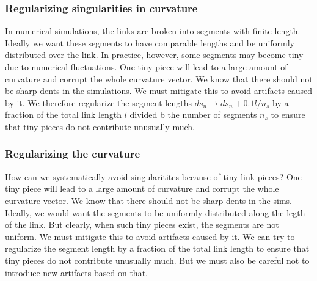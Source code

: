 \documentclass[nofootinbib,preprint,floatfix,titlepage,superscriptaddress]{revtex4} %
\begin{document}
\subsubsection{Regularizing singularities in curvature}
In numerical simulations, the links are broken into segments with finite length. 
Ideally we want these segments to have comparable lengths and be uniformly distributed over the link. 
In practice, however, some segments may become tiny due to numerical fluctuations. 
One tiny piece will lead to a large amount of curvature and corrupt the whole curvature vector. 
We know that there should not be sharp dents in the simulations. %
We must mitigate this to avoid artifacts caused by it. 
We therefore regularize the segment lengths $ds_n\to ds_n+ 0.1 l/n_s$ by a fraction of the total link length $l$ divided b the number of segments $n_s$ to ensure that tiny pieces do not contribute unusually much. 

\subsubsection{Regularizing the curvature}
How can we systematically avoid singularitites because of tiny link pieces? One tiny piece will lead to a large amount of curvature and corrupt the whole curvature vector. We know that there should not be sharp dents in the sims. Ideally, we would want the segments to be uniformly distributed along the legth of the link. But clearly, when such tiny pieces exist, the segments are not uniform. We must mitigate this to avoid artifacts caused by it. 
We can try to regularize the segment length by a fraction of the total link length to ensure that tiny pieces do not contribute unusually much. But we must also be careful not to introduce new artifacts based on that. 
\end{document}
